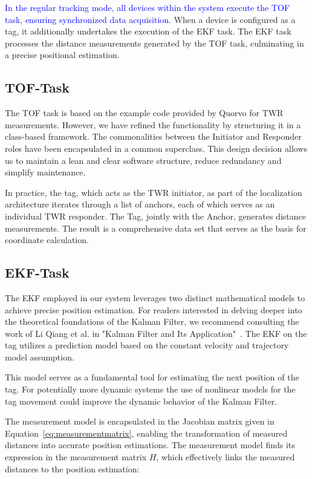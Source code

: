 \documentclass[conference, a4paper]{IEEEtran}
\begin{document}
\textcolor{blue}{In the regular tracking mode, all devices within the system execute the \ac{TOF} task, ensuring synchronized data acquisition.
}
When a device is configured as a tag,
it additionally undertakes the execution of the \ac{EKF} task.
The \ac{EKF} task processes the distance measurements generated by the \ac{TOF} task,
culminating in a precise positional estimation.

\subsection{TOF-Task}\label{section:firmware-tof}
The \ac{TOF} task is based on the example code
provided by Quorvo for \ac{TWR} measurements.
However, we have refined the functionality by structuring it in a class-based framework.
The commonalities between the Initiator and Responder roles have been
encapsulated in a common superclass.
This design decision allows us to maintain a lean and clear software structure,
reduce redundancy and simplify maintenance.

In practice, the tag, which acts as the \ac{TWR} initiator, as part of the localization architecture iterates through a list of anchors, each of which serves as an individual \ac{TWR} responder. 
The Tag, jointly with the Anchor, generates distance measurements. 
The result is a comprehensive data set that serves as the basis for coordinate calculation. 

\subsection{EKF-Task}\label{section:firmware-ekf}
The \ac{EKF} employed in our system leverages two distinct mathematical models
to achieve precise position estimation.
For readers interested in delving deeper into the theoretical foundations of the
Kalman Filter, we recommend consulting the work of Li Qiang et al. in
"Kalman Filter and Its Application"~\cite{Kalman}.
The EKF  on the tag utilizes a prediction model based on the constant velocity and trajectory model assumption.

This model serves as a fundamental tool for estimating the next position of the tag.
For potentially more dynamic systems the use of nonlinear models
for the tag movement could improve the dynamic behavior of the Kalman Filter.

The measurement model is encapsulated in the Jacobian matrix given in Equation~\ref{eq:measurementmatrix},
enabling the transformation of measured distances into accurate position estimations. 
The measurement model finds its expression in the measurement matrix $H$, 
which effectively links the measured distances to the position estimation:
\end{document}
